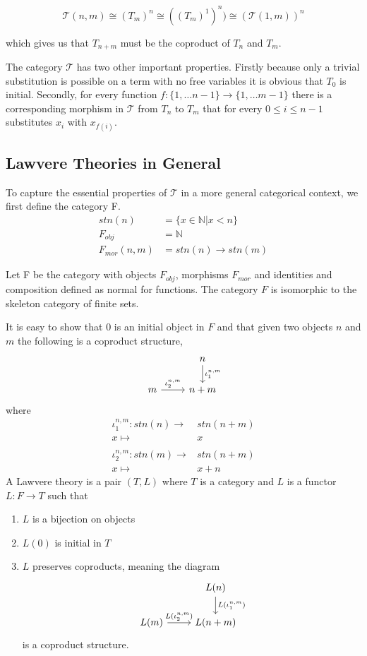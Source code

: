 \[\mathcal{T}(n,m)\cong (T_m)^n\cong ((T_m)^1)^n)\cong (\mathcal{T}(1, m))^n\]

which gives us that $T_{n+m}$ must be the coproduct of $T_n$ and
$T_m$.

The category $\mathcal{T}$ has two other important properties. Firstly because
only a trivial substitution is possible on a term with no free variables it is
obvious that $T_0$ is initial. Secondly, for every function $f: \{1,\ldots n-1\}
\rightarrow \{1,\ldots m-1\}$ there is a corresponding morphism in $\mathcal{T}$
from $T_n$ to $T_m$ that for every $0\leq i\leq n-1$ substitutes $x_i$ with
$x_{f(i)}$.

\subsection{Lawvere Theories in General}
To capture the essential properties of $\mathcal{T}$ in a more general
categorical context, we first define the category F.
\begin{align*}
    stn(n) &= \{x\in \mathbb{N} | x < n\} \\
    F_{obj} &= \mathbb{N} \\
    F_{mor}(n, m) &= stn(n)\to stn(m)
\end{align*}

Let F be the category with objects $F_{obj}$, morphisms $F_{mor}$ and identities
and composition defined as normal for functions. The category $F$ is isomorphic
to the skeleton category of finite sets.

It is easy to show that $0$ is an initial object in $F$ and that given two
objects $n$ and $m$ the following is a coproduct structure,
\[
\begin{tikzcd}
    & n\arrow[d, "\iota_1^{n,m}"] \\
    m\arrow[r, "\iota_2^{n,m}"] & n+m
\end{tikzcd}
\]
where
\begin{align*}
    \iota_1^{n,m}:stn(n)\to& stn(n+m) \\
    x\mapsto&x \\
    \\
    \iota_2^{n,m}:stn(m)\to& stn(n+m) \\
    x\mapsto&x+n
\end{align*}
A Lawvere theory is a pair $(T, L)$ where $T$ is a category and $L$ is a functor
$L : F \to T$ such that
\begin{enumerate}
    \item $L$ is a bijection on objects
    \item $L(0)$ is initial in $T$
    \item $L$ preserves coproducts, meaning the diagram
    \[
    \begin{tikzcd}
        & L(n)\arrow[d, "L(\iota_1^{n,m})"] \\
        L(m)\arrow[r, "L(\iota_2^{n,m})"] & L(n+m)
    \end{tikzcd}
    \]
    is a coproduct structure.
\end{enumerate}

